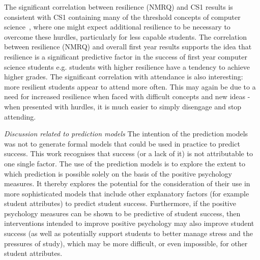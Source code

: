 \documentclass[sigconf]{acmart}
\begin{document}
The significant correlation between resilience (NMRQ) and CS1 results is consistent with CS1 containing many of the threshold concepts of computer science~\cite{Sanders:2016:TCC:2999541.2999546}, where one might expect additional resilience to be necessary to overcome these hurdles, particularly for less capable students.  The correlation between resilience (NMRQ) and overall first year results supports the idea that resilience is a significant predictive factor in the success of first year computer science students e.g. students with higher resilience have a tendency to achieve higher grades. The significant correlation with attendance is also interesting: more resilient students appear to attend more often. This may again be due to a need for increased resilience when faced with difficult concepts and new ideas - when presented with hurdles, it is much easier to simply disengage and stop attending.
 
{\em Discussion related to prediction models}
The intention of the prediction models was not to generate formal models that could be used in practice to predict success. This work recognises that success (or a lack of it) is not attributable to one single factor. The use of the prediction models is to explore the extent to which prediction is possible solely on the basis of the positive psychology measures.  It thereby explores the potential for the consideration of their use in more sophisticated models that include other explanatory factors (for example student attributes) to predict student success. Furthermore, if the positive psychology measures can be shown to be predictive of student success, then interventions intended to improve positive psychology may also improve student success (as well as potentially support students to better manage stress and the pressures of study), which may be more difficult, or even impossible, for other student attributes.
\end{document}
